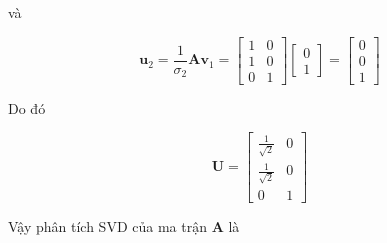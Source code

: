 \documentclass[12pt,a4paper,oneside]{report}
\numberwithin{equation}{section}
\begin{document}
và

$$
\mathbf{u}_{2}=\frac{1}{\sigma_{2}} \mathbf{A} \mathbf{v}_{1}=\left[\begin{array}{ll}
	1 & 0 \\
	1 & 0 \\
	0 & 1
\end{array}\right]\left[\begin{array}{l}
	0 \\
	1
\end{array}\right]=\left[\begin{array}{l}
	0 \\
	0 \\
	1
\end{array}\right]
$$

Do đó

$$
\mathbf{U}=\left[\begin{array}{cc}
	\frac{1}{\sqrt{2}} & 0 \\
	\frac{1}{\sqrt{2}} & 0 \\
	0 & 1
\end{array}\right]
$$

Vậy phân tích SVD của ma trận $\mathbf{A}$ là
\end{document}
